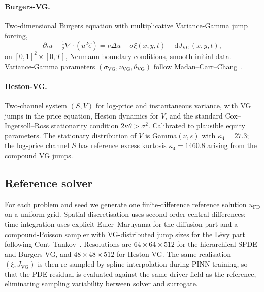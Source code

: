 \documentclass[review,12pt]{elsarticle}
\begin{document}
\paragraph{Burgers-VG.}
Two-dimensional Burgers equation with multiplicative
Variance-Gamma jump forcing,
\begin{equation}
\partial_t u + \tfrac12 \nabla \cdot (u^2 \hat e)
= \nu \Delta u + \sigma \xi(x, y, t)
+ \mathrm dJ_{\mathrm{VG}}(x, y, t),
\label{eq:burgersvg}
\end{equation}
on \([0,1]^2 \times [0, T]\), Neumann boundary conditions, smooth
initial data. Variance-Gamma parameters
\((\sigma_{\mathrm{VG}}, \nu_{\mathrm{VG}}, \theta_{\mathrm{VG}})\)
follow Madan--Carr--Chang~\cite{MadanCarrChang1998}.

\paragraph{Heston-VG.}
Two-channel system \((S, V)\) for log-price and instantaneous
variance, with VG jumps in the price equation, Heston dynamics for
\(V\), and the standard Cox--Ingersoll--Ross stationarity
condition \(2\kappa\theta > \sigma^2\). Calibrated to plausible
equity parameters. The stationary distribution of \(V\) is
Gamma\((\nu, s)\) with \(\kappa_4 = 27.3\); the log-price channel
\(S\) has reference excess kurtosis \(\kappa_4 = 1460.8\) arising
from the compound VG jumps.

\subsection{Reference solver}

For each problem and seed we generate one finite-difference
reference solution \(u_{\mathrm{FD}}\) on a uniform grid. Spatial
discretisation uses second-order central differences; time
integration uses explicit Euler--Maruyama for the diffusion part
and a compound-Poisson sampler with VG-distributed jump sizes for
the L\'evy part following Cont--Tankov~\cite{ContTankov2003}.
Resolutions are \(64\times 64 \times 512\) for the hierarchical
SPDE and Burgers-VG, and \(48\times 48 \times 512\) for
Heston-VG. The same realisation \((\xi, J_{\mathrm{VG}})\) is then
re-sampled by spline interpolation during PINN training, so that
the PDE residual is evaluated against the same driver field as
the reference, eliminating sampling variability between solver and
surrogate.
\end{document}
